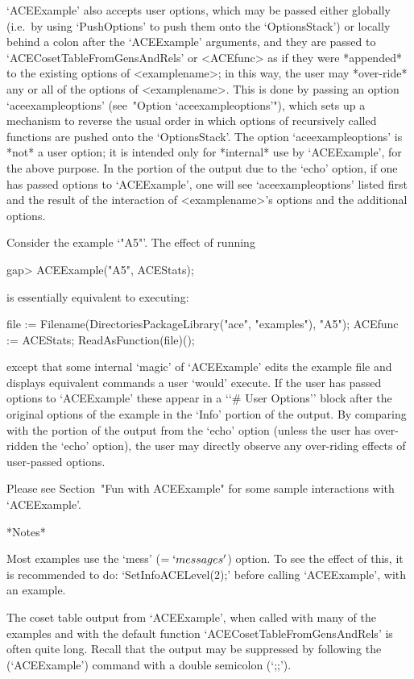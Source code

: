 `ACEExample' also accepts user options, which  may  be  passed  either
globally  (i.e.~by  using  `PushOptions'  to  push   them   onto   the
`OptionsStack') or locally  behind  a  colon  after  the  `ACEExample'
arguments, and they are passed  to  `ACECosetTableFromGensAndRels'  or
<ACEfunc> as if they  were  *appended*  to  the  existing  options  of
<examplename>; in this way, the user may *over-ride* any or all of the
options  of  <examplename>.  This  is  done  by  passing   an   option
`aceexampleoptions' (see~"Option `aceexampleoptions'"), which sets  up
a mechanism to reverse the usual order in which options of recursively
called functions  are  pushed  onto  the  `OptionsStack'.  The  option
`aceexampleoptions' is *not* a user option; it is  intended  only  for
*internal* use by `ACEExample', for the above purpose. In the  portion
of the output due to the `echo' option, if one has passed  options  to
`ACEExample', one will see `aceexampleoptions' listed  first  and  the
result  of  the  interaction  of  <examplename>'s  options   and   the
additional options.

Consider the example `"A5"'. The effect of running

\beginexample
gap> ACEExample("A5", ACEStats);
\endexample

is essentially equivalent to executing:

\beginexample
file := Filename(DirectoriesPackageLibrary("ace", "examples"), "A5");
ACEfunc := ACEStats;
ReadAsFunction(file)();
\endexample

except that  some  internal  \lq{}magic'  of  `ACEExample'  edits  the
example file and  displays  equivalent  commands  a  user  \lq{}would'
execute. If the user has passed options to `ACEExample'  these  appear
in a \lq{}`\# User Options'' block after the original options  of  the
example in the `Info' portion of the output.  By  comparing  with  the
portion of the output from the `echo'  option  (unless  the  user  has
over-ridden the `echo' option), the  user  may  directly  observe  any
over-riding effects of user-passed options.

Please see Section~"Fun with ACEExample" for some sample  interactions
with `ACEExample'.

*Notes*

Most examples use the `mess'  ($=  `messages'$)  option.  To  see  the
effect of this, it is recommended to do: `SetInfoACELevel(2);'  before
calling `ACEExample', with an example.

The coset table output from `ACEExample', when called with many of the
examples     and     with     the     default     {\ACE}      function
`ACECosetTableFromGensAndRels' is often quite long.  Recall  that  the
output may be suppressed by following the (`ACEExample') command  with
a double semicolon (`;;').

